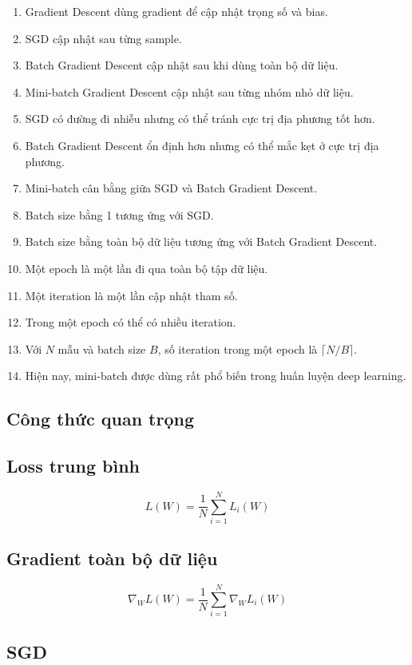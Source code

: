 \begin{enumerate}
    \item Gradient Descent dùng gradient để cập nhật trọng số và bias.
    \item SGD cập nhật sau từng sample.
    \item Batch Gradient Descent cập nhật sau khi dùng toàn bộ dữ liệu.
    \item Mini-batch Gradient Descent cập nhật sau từng nhóm nhỏ dữ liệu.
    \item SGD có đường đi nhiễu nhưng có thể tránh cực trị địa phương tốt hơn.
    \item Batch Gradient Descent ổn định hơn nhưng có thể mắc kẹt ở cực trị địa phương.
    \item Mini-batch cân bằng giữa SGD và Batch Gradient Descent.
    \item Batch size bằng 1 tương ứng với SGD.
    \item Batch size bằng toàn bộ dữ liệu tương ứng với Batch Gradient Descent.
    \item Một epoch là một lần đi qua toàn bộ tập dữ liệu.
    \item Một iteration là một lần cập nhật tham số.
    \item Trong một epoch có thể có nhiều iteration.
    \item Với $N$ mẫu và batch size $B$, số iteration trong một epoch là $\lceil N/B\rceil$.
    \item Hiện nay, mini-batch được dùng rất phổ biến trong huấn luyện deep learning.
\end{enumerate}

\subsection{Công thức quan trọng}

\subsection*{Loss trung bình}

\[
    L(W)=\frac{1}{N}\sum_{i=1}^{N}L_i(W)
\]

\subsection*{Gradient toàn bộ dữ liệu}

\[
    \nabla_W L(W)
    =
    \frac{1}{N}
    \sum_{i=1}^{N}
    \nabla_W L_i(W)
\]

\subsection*{SGD}


